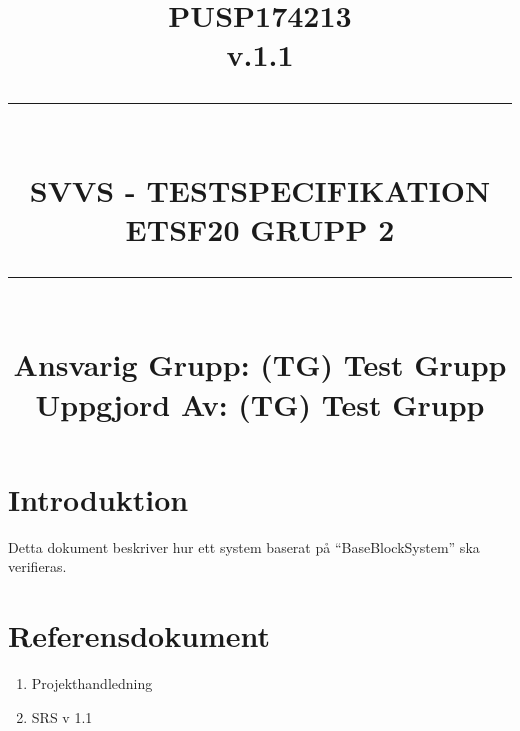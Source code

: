 \documentclass[paper=a4, fontsize=11pt,twoside]{article}
\title{
		\documentNumber{#1}																						
		\documentVersion{#2}																				
		\HRule{0.5pt} \\ %
		\LARGE \textbf{\uppercase{#3}} \\
		\large \textbf{\uppercase{ETSF20 Grupp 2}} 
		\HRule{2pt} \\ [1.5cm]    
		\normalsize            
		\documentResponsible{#4} \\ 
		\documentCreator{#4}  
	}
\newcommand{\HRule}[1]{\rule{\linewidth}{#1}}
\newcommand{\documentNumber}[1]{\centering PUSP1742#1 \\[1.0cm]}
\newcommand{\documentVersion}[1]{\centering \small{v.#1} \\[1.0cm]}
\newcommand{\documentResponsible}[1]{\centering  Ansvarig Grupp: #1}
\newcommand{\documentCreator}[1]{\centering Uppgjord Av: #1}
\newcommand{\grouptitlepage}[4]{ 
	\title{
		\documentNumber{#1}																						
		\documentVersion{#2}																				
		\HRule{0.5pt} \\ %
		\LARGE \textbf{\uppercase{#3}} \\
		\large \textbf{\uppercase{ETSF20 Grupp 2}} 
		\HRule{2pt} \\ [1.5cm]    
		\normalsize            
		\documentResponsible{#4} \\ 
		\documentCreator{#4}  
	}																							
	\maketitle																							
	\thispagestyle{empty} 																					
	\newpage 
}
\begin{document}
\grouptitlepage
{13}
{1.1}
{SVVS - Testspecifikation}
{(TG) Test Grupp} %
\tableofcontents
\section{Introduktion}

 Detta dokument beskriver hur ett system baserat på “BaseBlockSystem”
 ska verifieras.
 

\section{Referensdokument}

\begin{enumerate}
\item Projekthandledning
\item SRS v 1.1
\end{enumerate}
\end{document}
